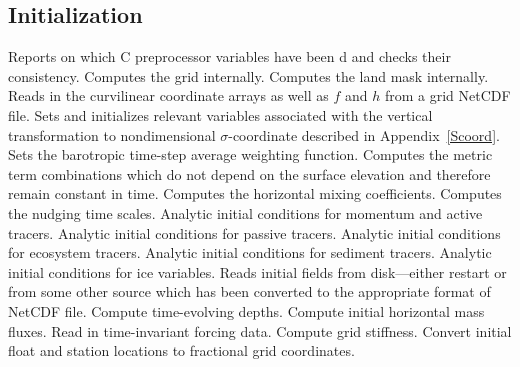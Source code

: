 \subsection{Initialization}
\label{Ini}
   \begin{klist}
     Reports on which C preprocessor variables
   have been d and checks their consistency.
      Computes the grid internally.
      Computes the land mask internally.
      Reads in the curvilinear coordinate arrays as
   well as $f$ and $h$ from a grid NetCDF file.
       Sets and initializes relevant variables
   associated with the vertical transformation to nondimensional
   $\sigma$-coordinate described in Appendix~\ref{Scoord}.
      Sets the barotropic time-step average
   weighting function.
        Computes the metric term combinations which do
   not depend on the surface elevation and therefore remain constant in
   time.
      Computes the horizontal mixing coefficients.
      Computes the nudging time scales.
      Analytic initial conditions for momentum and
     active tracers.
      Analytic initial conditions for passive tracers.
      Analytic initial conditions for ecosystem tracers.
      Analytic initial conditions for sediment tracers.
      Analytic initial conditions for ice variables.
      Reads initial fields from disk---either
   restart or from some other source which has been converted to the
   appropriate format of NetCDF file.
       Compute time-evolving depths.
       Compute initial horizontal mass fluxes.
      Read in time-invariant forcing data.
      Compute grid stiffness.
       Convert initial float and station locations to
     fractional grid coordinates.
   \end{klist}

